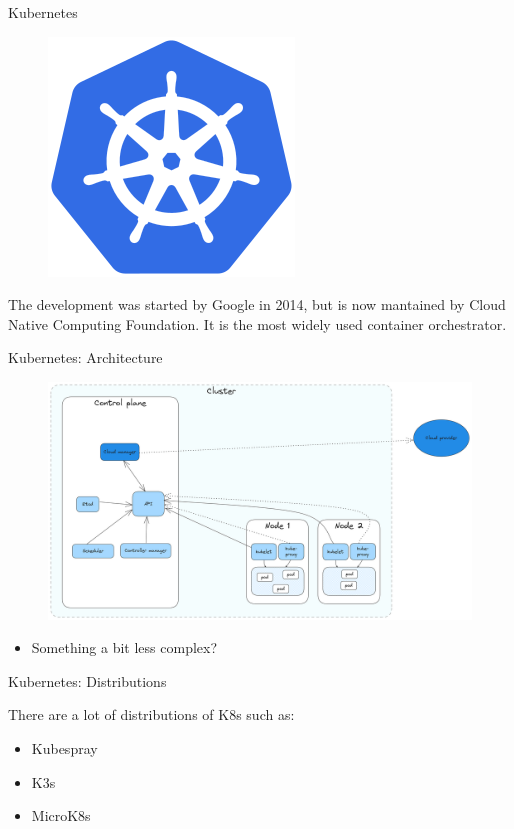 \begin{frame}{Kubernetes}
\begin{figure}
    \centering
    \includegraphics[width=0.2\linewidth]{static/Kubernetes_logo_without_workmark.svg.png}
\end{figure}
 The development was started by Google in 2014, but is now mantained by Cloud Native Computing Foundation. 
It is the most widely used container orchestrator.

\end{frame}

\begin{frame}{Kubernetes: Architecture}

\begin{figure}
    \centering
    \includegraphics[width=1\linewidth]{static/Untitled-2023-09-27-1503(3).png}
\end{figure}

\begin{itemize}
    \item<2-> Something a bit less complex?
\end{itemize}

\end{frame}

\begin{frame}{Kubernetes: Distributions}

There are a lot of distributions of K8s such as:

\begin{itemize}
    \item Kubespray 
    \item K3s 
    \item MicroK8s 
\end{itemize}

\end{frame}
